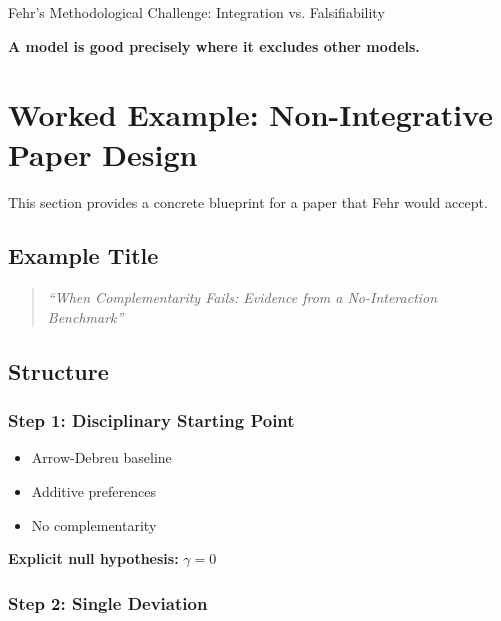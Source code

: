 \begin{chapter}{Fehr's Methodological Challenge: Integration vs. Falsifiability}
\begin{tcolorbox}[colback=red!5!white,colframe=red!75!black,title=\textbf{Fehr-Compatible Principle}]
\begin{center}
\textbf{A model is good precisely where it excludes other models.}
\end{center}
\end{tcolorbox}


\section{Worked Example: Non-Integrative Paper Design}
\label{sec:worked-example}

This section provides a concrete blueprint for a paper that Fehr would accept.

\subsection{Example Title}

\begin{quote}
\textit{``When Complementarity Fails: Evidence from a No-Interaction Benchmark''}
\end{quote}

\subsection{Structure}

\subsubsection{Step 1: Disciplinary Starting Point}

\begin{itemize}[noitemsep]
    \item Arrow-Debreu baseline
    \item Additive preferences
    \item No complementarity
\end{itemize}

\textbf{Explicit null hypothesis:} $\gamma = 0$

\subsubsection{Step 2: Single Deviation}


\end{chapter}
